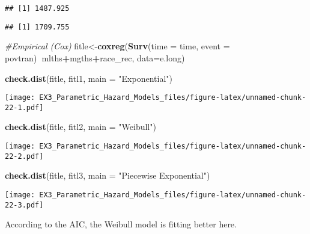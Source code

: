 \documentclass[
]{article}
\newenvironment{Shaded}{\begin{snugshade}}{\end{snugshade}}
\newcommand{\CommentTok}[1]{\textcolor[rgb]{0.56,0.35,0.01}{\textit{#1}}}
\newcommand{\DataTypeTok}[1]{\textcolor[rgb]{0.13,0.29,0.53}{#1}}
\newcommand{\DecValTok}[1]{\textcolor[rgb]{0.00,0.00,0.81}{#1}}
\newcommand{\KeywordTok}[1]{\textcolor[rgb]{0.13,0.29,0.53}{\textbf{#1}}}
\newcommand{\NormalTok}[1]{#1}
\newcommand{\OperatorTok}[1]{\textcolor[rgb]{0.81,0.36,0.00}{\textbf{#1}}}
\newcommand{\StringTok}[1]{\textcolor[rgb]{0.31,0.60,0.02}{#1}}
\begin{document}
\begin{verbatim}
## [1] 1487.925
\end{verbatim}

\begin{Shaded}
\end{Shaded}

\begin{verbatim}
## [1] 1709.755
\end{verbatim}

\begin{Shaded}
\begin{Highlighting}[]
\CommentTok{#Empirical (Cox)}
\NormalTok{fitle<-}\KeywordTok{coxreg}\NormalTok{(}\KeywordTok{Surv}\NormalTok{(}\DataTypeTok{time =}\NormalTok{ time, }\DataTypeTok{event =}\NormalTok{ povtran)}\OperatorTok{~}\NormalTok{mlths}\OperatorTok{+}\NormalTok{mgths}\OperatorTok{+}\NormalTok{race_rec, }\DataTypeTok{data=}\NormalTok{e.long)}

\KeywordTok{check.dist}\NormalTok{(fitle, fitl1, }\DataTypeTok{main =} \StringTok{"Exponential"}\NormalTok{)}
\end{Highlighting}
\end{Shaded}

\texttt{[image: EX3\_Parametric\_Hazard\_Models\_files/figure-latex/unnamed-chunk-22-1.pdf]}

\begin{Shaded}
\begin{Highlighting}[]
\KeywordTok{check.dist}\NormalTok{(fitle, fitl2, }\DataTypeTok{main =} \StringTok{"Weibull"}\NormalTok{)}
\end{Highlighting}
\end{Shaded}

\texttt{[image: EX3\_Parametric\_Hazard\_Models\_files/figure-latex/unnamed-chunk-22-2.pdf]}

\begin{Shaded}
\begin{Highlighting}[]
\KeywordTok{check.dist}\NormalTok{(fitle, fitl3, }\DataTypeTok{main =} \StringTok{"Piecewise Exponential"}\NormalTok{)}
\end{Highlighting}
\end{Shaded}

\texttt{[image: EX3\_Parametric\_Hazard\_Models\_files/figure-latex/unnamed-chunk-22-3.pdf]}

According to the AIC, the Weibull model is fitting better here.
\end{document}
